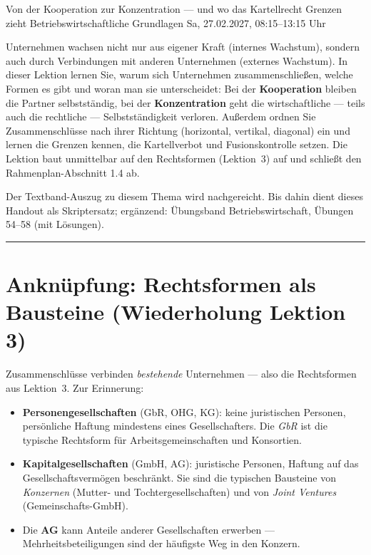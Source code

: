 \documentclass[11pt, a4paper]{article}
\begin{document}
%
  {Von der Kooperation zur Konzentration --- und wo das Kartellrecht Grenzen zieht}%
  {Betriebswirtschaftliche Grundlagen}%
  {Sa, 27.02.2027, 08:15--13:15 Uhr}

\begin{merksatz}[title={\bfseries Worum geht es in dieser Lektion?}]
Unternehmen wachsen nicht nur aus eigener Kraft (internes Wachstum), sondern auch durch
Verbindungen mit anderen Unternehmen (externes Wachstum). In dieser Lektion lernen Sie,
warum sich Unternehmen zusammenschließen, welche Formen es gibt und woran man sie
unterscheidet: Bei der \textbf{Kooperation} bleiben die Partner selbstständig, bei der
\textbf{Konzentration} geht die wirtschaftliche --- teils auch die rechtliche ---
Selbstständigkeit verloren. Außerdem ordnen Sie Zusammenschlüsse nach ihrer Richtung
(horizontal, vertikal, diagonal) ein und lernen die Grenzen kennen, die Kartellverbot und
Fusionskontrolle setzen. Die Lektion baut unmittelbar auf den Rechtsformen (Lektion~3)
auf und schließt den Rahmenplan-Abschnitt 1.4 ab.
\end{merksatz}

\begin{beispiel}[title={Hinweis zur Literatur}]
Der Textband-Auszug zu diesem Thema wird nachgereicht. Bis dahin dient dieses Handout als
Skriptersatz; ergänzend: Übungsband Betriebswirtschaft, Übungen 54--58 (mit Lösungen).
\end{beispiel}

\tableofcontents
\vspace{1em}
\hrule
\vspace{1em}

\section{Anknüpfung: Rechtsformen als Bausteine (Wiederholung Lektion 3)}

Zusammenschlüsse verbinden \emph{bestehende} Unternehmen --- also die Rechtsformen aus
Lektion~3. Zur Erinnerung:

\begin{itemize}
  \item \textbf{Personengesellschaften} (GbR, OHG, KG): keine juristischen Personen,
    persönliche Haftung mindestens eines Gesellschafters. Die \emph{GbR} ist die typische
    Rechtsform für Arbeitsgemeinschaften und Konsortien.
  \item \textbf{Kapitalgesellschaften} (GmbH, AG): juristische Personen, Haftung auf das
    Gesellschaftsvermögen beschränkt. Sie sind die typischen Bausteine von
    \emph{Konzernen} (Mutter- und Tochtergesellschaften) und von \emph{Joint Ventures}
    (Gemeinschafts-GmbH).
  \item Die \textbf{AG} kann Anteile anderer Gesellschaften erwerben ---
    Mehrheitsbeteiligungen sind der häufigste Weg in den Konzern.
\end{itemize}
\end{document}
